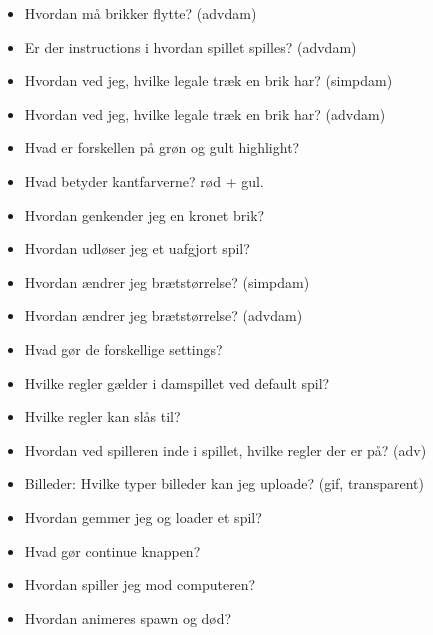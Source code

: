 \begin{itemize}
    \item Hvordan må brikker flytte? (advdam) \CT
    \item Er der instructions i hvordan spillet spilles? (advdam) \CT
    \item Hvordan ved jeg, hvilke legale træk en brik har? (simpdam) \CT
    \item Hvordan ved jeg, hvilke legale træk en brik har? (advdam) \CT
    \item Hvad er forskellen på grøn og gult highlight? \CT
    \item Hvad betyder kantfarverne? rød + gul. \CT
    \item Hvordan genkender jeg en kronet brik? \CT
    \item Hvordan udløser jeg et uafgjort spil? \CT
    \item Hvordan ændrer jeg brætstørrelse? (simpdam) \CT
    \item Hvordan ændrer jeg brætstørrelse? (advdam) \CT
    \item Hvad gør de forskellige settings? \CT
    \item Hvilke regler gælder i damspillet ved default spil? \CT
    \item Hvilke regler kan slås til? \CT
    \item Hvordan ved spilleren inde i spillet, hvilke regler der er på? (adv) \CT
    \item Billeder: Hvilke typer billeder kan jeg uploade? (gif, transparent) \CT
    \item Hvordan gemmer jeg og loader et spil? \CT
    \item Hvad gør continue knappen? \CT
    \item Hvordan spiller jeg mod computeren? \CT
    \item Hvordan animeres spawn og død? \CT
\end{itemize}